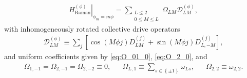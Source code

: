 \documentclass[nofootinbib,notitlepage,11pt]{revtex4-2}
\renewcommand{\t}{\text} %
\newcommand{\p}[1]{\left(#1\right)} %
\renewcommand{\sp}[1]{\left[#1\right]} %
\renewcommand{\set}[1]{\left\{#1\right\}} %
\newcommand{\1}{\mathds{1}}
\newcommand{\D}{\mathcal{D}}
\begin{document}
\begin{align}
  \left. H_{\t{Raman}}^{(\phi)} \right|_{\phi_m=m\phi}
  = \sum_{\substack{L\le2\\0\le M\le L}} \Omega_{LM} \D_{LM}^{(\phi)},
\end{align}
with inhomogeneously rotated collective drive operators
\begin{align}
  \D_{LM}^{(\phi)}
  \equiv \sum_j \sp{\cos\p{M\phi j} D_{LM}^{(j)}
    + \sin\p{M\phi j} D_{L,-M}^{(j)}},
\end{align}
and uniform coefficients given by \eqref{eq:O_01_0}, \eqref{eq:O_2_0},
and
\begin{align}
  \Omega_{1,-1} = \Omega_{2,-1} = \Omega_{2,-2} \equiv 0,
  &&
  \Omega_{L,1} \equiv \sum_{s\in\set{\pm1}} \omega_{Ls},
  &&
  \Omega_{2,2} \equiv \omega_{2,2}.
\end{align}



\end{document}
